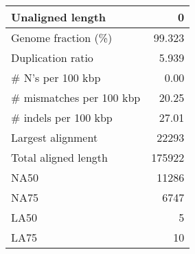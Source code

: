 \documentclass[12pt,a4paper]{article}
\begin{document}
\begin{table}[ht]
\begin{center}
\begin{tabular}{|l*{1}{|r}|}
Unaligned length & 0 \\ \hline
Genome fraction (\%) & 99.323 \\ \hline
Duplication ratio & 5.939 \\ \hline
\# N's per 100 kbp & 0.00 \\ \hline
\# mismatches per 100 kbp & 20.25 \\ \hline
\# indels per 100 kbp & 27.01 \\ \hline
Largest alignment & 22293 \\ \hline
Total aligned length & 175922 \\ \hline
NA50 & 11286 \\ \hline
NA75 & 6747 \\ \hline
LA50 & 5 \\ \hline
LA75 & 10 \\ \hline
\end{tabular}
\end{center}
\end{table}
\end{document}
